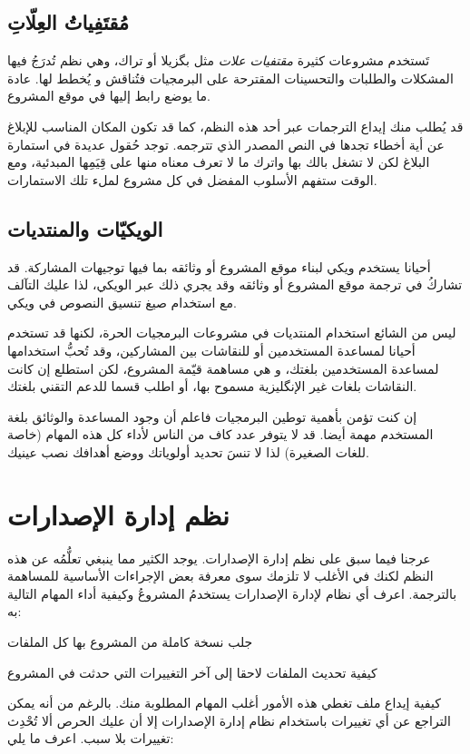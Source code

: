 \subsection{مُقتَفِياتُ العِلّاتِ}
تَستخدم مشروعات كثيرة {\it مقتفيات علات} مثل بگزيلا أو تراك، وهي نظم
تُدرَجُ فيها المشكلات والطلبات والتحسينات المقترحة على البرمجيات
فتُناقش و يُخطط لها. عادة ما يوضع رابط إليها في موقع المشروع.

قد يُطلب منك إيداع الترجمات عبر أحد هذه النظم، كما قد تكون المكان
المناسب للإبلاغ عن أية أخطاء تجدها في النص المصدر الذي تترجمه. توجد
حُقول عديدة في استمارة البلاغ لكن لا تشغل بالك بها واترك ما لا تعرف
معناه منها على قِيَمِها المبدئية، ومع الوقت ستفهم الأسلوب المفضل في كل
مشروع لملء تلك الاستمارات.

\subsection{الويكيّات والمنتديات}
أحيانا يستخدم ويكي لبناء موقع المشروع أو وثائقه بما فيها توجيهات
المشاركة. قد تشاركُ في ترجمة موقع المشروع أو وثائقه وقد يجري ذلك عبر
الويكي، لذا عليك التآلف مع استخدام صيغ تنسيق النصوص في ويكي.

ليس من الشائع استخدام المنتديات في مشروعات البرمجيات الحرة، لكنها قد
تستخدم أحيانا لمساعدة المستخدمين أو للنقاشات بين المشاركين، وقد تُحبُّ
استخدامها لمساعدة المستخدمين بلغتك، و هي مساهمة قيّمة المشروع، لكن
استطلع إن كانت النقاشات بلغات غير الإنگليزية مسموح بها، أو اطلب قسما
للدعم التقني بلغتك.

إن كنت تؤمن بأهمية توطين البرمجيات فاعلم أن وجود المساعدة والوثائق بلغة
المستخدم مهمة أيضا. قد لا يتوفر عدد كاف من الناس لأداء كل هذه المهام
(خاصة للغات الصغيرة) لذا لا تنسَ تحديد أولوياتك ووضع أهدافك نصب عينيك.

\section[ref:34384626]{نظم إدارة الإصدارات}
عرجنا فيما سبق على نظم إدارة
الإصدارات. يوجد الكثير مما ينبغي تعلُّمُه عن هذه النظم لكنك في الأغلب
لا تلزمك سوى معرفة بعض الإجراءات الأساسية للمساهمة بالترجمة. اعرف أي
نظام لإدارة الإصدارات يستخدمُ المشروعُ وكيفية أداء المهام التالية به:

\startitemize[1]
\item جلب نسخة كاملة من المشروع بها كل الملفات
\item كيفية تحديث الملفات لاحقا إلى آخر التغييرات التي حدثت في المشروع
\item كيفية إيداع ملف
\stopitemize
تغطي هذه الأمور أغلب المهام المطلوبة منك. بالرغم من أنه يمكن التراجع عن
أي تغييرات باستخدام نظام إدارة الإصدارات إلا أن عليك الحرص ألا تُحْدِث
تغييرات بلا سبب. اعرف ما يلي:

